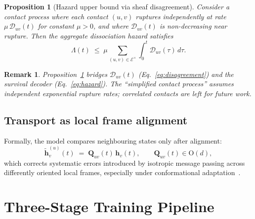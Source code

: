 \documentclass[12pt,a4paper]{article}
\newtheorem{proposition}{Proposition}
\newtheorem{remark}{Remark}
\begin{document}
\begin{proposition}[Hazard upper bound via sheaf disagreement]
\label{prop:hazard}
Consider a contact process where each contact $(u,v)$ ruptures
independently at rate $\mu\,\mathcal{D}_{uv}(t)$ for constant $\mu>0$,
and where $\mathcal{D}_{uv}(t)$ is non-decreasing near rupture.
Then the aggregate dissociation hazard satisfies
\begin{equation}
  \Lambda(t)
  \;\le\;
  \mu\!\sum_{(u,v)\in\mathcal{E}^{\times}}
  \int_0^t \mathcal{D}_{uv}(\tau)\,d\tau.
  \label{eq:hazardbound}
\end{equation}
\end{proposition}

\begin{remark}
Proposition~\ref{prop:hazard} bridges $\mathcal{D}_{uv}(t)$
(Eq.~\ref{eq:disagreement}) and the survival decoder
(Eq.~\ref{eq:hazard}).
The ``simplified contact process'' assumes independent exponential
rupture rates; correlated contacts are left for future work.
\end{remark}

\subsection{Transport as local frame alignment}

Formally, the model compares neighbouring states only after alignment:
\begin{equation}
  \tilde{\mathbf{h}}_v^{(u)}(t)
  \;=\;
  \mathbf{Q}_{uv}(t)\,\mathbf{h}_v(t),
  \qquad
  \mathbf{Q}_{uv}(t)\in\mathrm{O}(d),
  \label{eq:align}
\end{equation}
which corrects systematic errors introduced by isotropic message passing
across differently oriented local frames, especially under conformational
adaptation~\citep{physicsinformedsheaf2025,hansen2019spectral}.

\section{Three-Stage Training Pipeline}
\label{sec:training}
\end{document}
